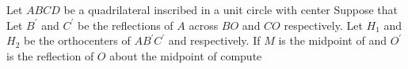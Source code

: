 Let $ABCD$ be a quadrilateral inscribed in a unit circle with center   Suppose that    Let $B^\prime$ and $C^\prime$ be the reflections of $A$ across $BO$ and $CO$ respectively.  Let $H_1$ and $H_2$ be the orthocenters of $AB^\prime C^\prime$ and  respectively.  If $M$ is the midpoint of  and $O^\prime$ is the reflection of $O$ about the midpoint of  compute 